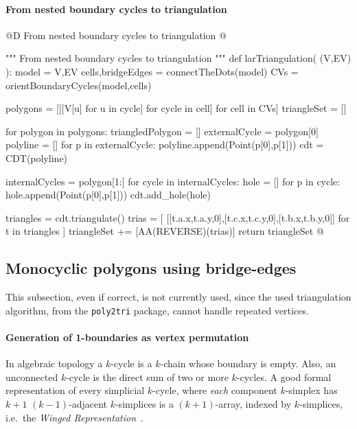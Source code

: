 \documentclass[11pt,oneside]{article}	%
\begin{document}
\paragraph{From nested boundary cycles to triangulation}
@D From nested boundary cycles to triangulation 
@{""" From nested boundary cycles to triangulation """
def larTriangulation( (V,EV) ):
    model = V,EV
    cells,bridgeEdges = connectTheDots(model)
    CVs = orientBoundaryCycles(model,cells)
    
    polygons = [[[V[u] for u in cycle] for cycle in cell] for cell in CVs]
    triangleSet = []   
    
    for polygon in polygons:
        triangledPolygon = []
        externalCycle = polygon[0]
        polyline = []
        for p in externalCycle:
            polyline.append(Point(p[0],p[1]))
        cdt = CDT(polyline)
        
        internalCycles = polygon[1:]
        for cycle in internalCycles:
            hole = []
            for p in cycle:
                hole.append(Point(p[0],p[1]))
            cdt.add_hole(hole)
            
        triangles = cdt.triangulate()
        trias = [ [[t.a.x,t.a.y,0],[t.c.x,t.c.y,0],[t.b.x,t.b.y,0]] for t in triangles ]
        triangleSet += [AA(REVERSE)(trias)]
    return triangleSet
@}


\subsection{Monocyclic polygons using bridge-edges}

This subsection, even if correct, is not currently used, since the used triangulation algorithm, from the \texttt{poly2tri} package, cannot handle repeated vertices.

\paragraph{Generation of 1-boundaries as vertex permutation}
In algebraic topology a $k$-cycle is a $k$-chain whose boundary is empty. Also, an unconnected $k$-cycle is the direct sum of two or more $k$-cycles. A good formal representation of every simplicial $k$-cycle, where \emph{each} component $k$-simplex has $k+1$ $(k-1)$-adjacent $k$-simplices is a $(k+1)$-array, indexed by $k$-simplices, i.e.~the \emph{Winged Representation}~\cite{Paoluzzi:1993:DMS:169728.169719}. 
\end{document}
